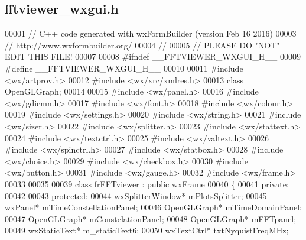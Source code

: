 \subsection{fftviewer\+\_\+wxgui.\+h}
\label{fftviewer__wxgui_8h_source}

\begin{DoxyCode}
00001 \textcolor{comment}{// C++ code generated with wxFormBuilder (version Feb 16 2016)}
00003 \textcolor{comment}{// http://www.wxformbuilder.org/}
00004 \textcolor{comment}{//}
00005 \textcolor{comment}{// PLEASE DO "NOT" EDIT THIS FILE!}
00007 \textcolor{comment}{}
00008 \textcolor{preprocessor}{#ifndef \_\_FFTVIEWER\_WXGUI\_H\_\_}
00009 \textcolor{preprocessor}{#define \_\_FFTVIEWER\_WXGUI\_H\_\_}
00010 
00011 \textcolor{preprocessor}{#include <wx/artprov.h>}
00012 \textcolor{preprocessor}{#include <wx/xrc/xmlres.h>}
00013 \textcolor{keyword}{class }OpenGLGraph;
00014 
00015 \textcolor{preprocessor}{#include <wx/panel.h>}
00016 \textcolor{preprocessor}{#include <wx/gdicmn.h>}
00017 \textcolor{preprocessor}{#include <wx/font.h>}
00018 \textcolor{preprocessor}{#include <wx/colour.h>}
00019 \textcolor{preprocessor}{#include <wx/settings.h>}
00020 \textcolor{preprocessor}{#include <wx/string.h>}
00021 \textcolor{preprocessor}{#include <wx/sizer.h>}
00022 \textcolor{preprocessor}{#include <wx/splitter.h>}
00023 \textcolor{preprocessor}{#include <wx/stattext.h>}
00024 \textcolor{preprocessor}{#include <wx/textctrl.h>}
00025 \textcolor{preprocessor}{#include <wx/valtext.h>}
00026 \textcolor{preprocessor}{#include <wx/spinctrl.h>}
00027 \textcolor{preprocessor}{#include <wx/statbox.h>}
00028 \textcolor{preprocessor}{#include <wx/choice.h>}
00029 \textcolor{preprocessor}{#include <wx/checkbox.h>}
00030 \textcolor{preprocessor}{#include <wx/button.h>}
00031 \textcolor{preprocessor}{#include <wx/gauge.h>}
00032 \textcolor{preprocessor}{#include <wx/frame.h>}
00033 
00035 
00039 \textcolor{keyword}{class }frFFTviewer : \textcolor{keyword}{public} wxFrame 
00040 \{
00041     \textcolor{keyword}{private}:
00042     
00043     \textcolor{keyword}{protected}:
00044         wxSplitterWindow* mPlotsSplitter;
00045         wxPanel* mTimeConstellationPanel;
00046         OpenGLGraph* mTimeDomainPanel;
00047         OpenGLGraph* mConstelationPanel;
00048         OpenGLGraph* mFFTpanel;
00049         wxStaticText* m_staticText6;
00050         wxTextCtrl* txtNyquistFreqMHz;

\end{DoxyCode}
